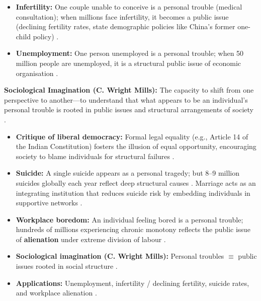 \begin{ExampleBox}
\begin{itemize}
    \item \textbf{Infertility:} One couple unable to conceive is a personal trouble (medical consultation); when millions face infertility, it becomes a public issue (declining fertility rates, state demographic policies like China's former one-child policy) .
    \item \textbf{Unemployment:} One person unemployed is a personal trouble; when 50 million people are unemployed, it is a structural public issue of economic organisation .
\end{itemize}
\end{ExampleBox}

\begin{KeyConcept}
\textbf{Sociological Imagination (C. Wright Mills):} The capacity to shift from one perspective to another---to understand that what appears to be an individual's personal trouble is rooted in public issues and structural arrangements of society .
\begin{itemize}
    \item \textbf{Critique of liberal democracy:} Formal legal equality (e.g., Article 14 of the Indian Constitution) fosters the illusion of equal opportunity, encouraging society to blame individuals for structural failures .
    \item \textbf{Suicide:} A single suicide appears as a personal tragedy; but 8--9 million suicides globally each year reflect deep structural causes . Marriage acts as an integrating institution that reduces suicide risk by embedding individuals in supportive networks .
    \item \textbf{Workplace boredom:} An individual feeling bored is a personal trouble; hundreds of millions experiencing chronic monotony reflects the public issue of \textbf{alienation} under extreme division of labour .
\end{itemize}
\end{KeyConcept}

\begin{QuickRevision}
\begin{itemize}
    \item \textbf{Sociological imagination (C. Wright Mills):} Personal troubles $\equiv$ public issues rooted in social structure .
    \item \textbf{Applications:} Unemployment, infertility / declining fertility, suicide rates, and workplace alienation .
\end{itemize}
\end{QuickRevision}

